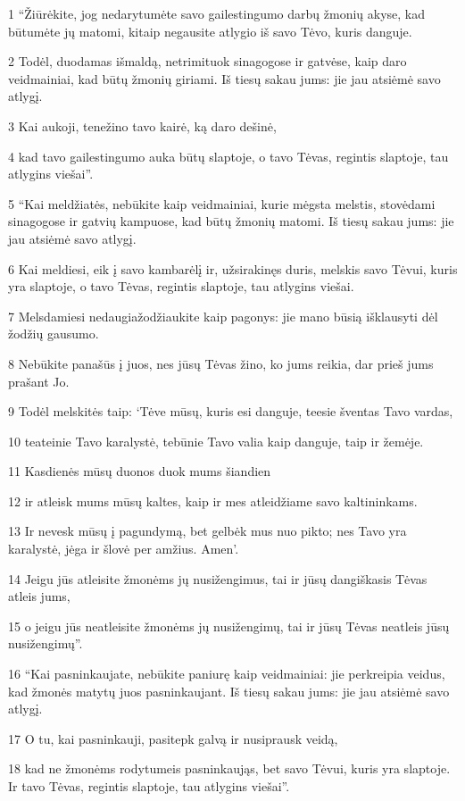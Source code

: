 \par 1 “Žiūrėkite, jog nedarytumėte savo gailestingumo darbų žmonių akyse, kad būtumėte jų matomi, kitaip negausite atlygio iš savo Tėvo, kuris danguje. 
\par 2 Todėl, duodamas išmaldą, netrimituok sinagogose ir gatvėse, kaip daro veidmainiai, kad būtų žmonių giriami. Iš tiesų sakau jums: jie jau atsiėmė savo atlygį. 
\par 3 Kai aukoji, tenežino tavo kairė, ką daro dešinė, 
\par 4 kad tavo gailestingumo auka būtų slaptoje, o tavo Tėvas, regintis slaptoje, tau atlygins viešai”. 
\par 5 “Kai meldžiatės, nebūkite kaip veidmainiai, kurie mėgsta melstis, stovėdami sinagogose ir gatvių kampuose, kad būtų žmonių matomi. Iš tiesų sakau jums: jie jau atsiėmė savo atlygį. 
\par 6 Kai meldiesi, eik į savo kambarėlį ir, užsirakinęs duris, melskis savo Tėvui, kuris yra slaptoje, o tavo Tėvas, regintis slaptoje, tau atlygins viešai. 
\par 7 Melsdamiesi nedaugiažodžiaukite kaip pagonys: jie mano būsią išklausyti dėl žodžių gausumo. 
\par 8 Nebūkite panašūs į juos, nes jūsų Tėvas žino, ko jums reikia, dar prieš jums prašant Jo. 
\par 9 Todėl melskitės taip: ‘Tėve mūsų, kuris esi danguje, teesie šventas Tavo vardas, 
\par 10 teateinie Tavo karalystė, tebūnie Tavo valia kaip danguje, taip ir žemėje. 
\par 11 Kasdienės mūsų duonos duok mums šiandien 
\par 12 ir atleisk mums mūsų kaltes, kaip ir mes atleidžiame savo kaltininkams. 
\par 13 Ir nevesk mūsų į pagundymą, bet gelbėk mus nuo pikto; nes Tavo yra karalystė, jėga ir šlovė per amžius. Amen’. 
\par 14 Jeigu jūs atleisite žmonėms jų nusižengimus, tai ir jūsų dangiškasis Tėvas atleis jums, 
\par 15 o jeigu jūs neatleisite žmonėms jų nusižengimų, tai ir jūsų Tėvas neatleis jūsų nusižengimų”. 
\par 16 “Kai pasninkaujate, nebūkite paniurę kaip veidmainiai: jie perkreipia veidus, kad žmonės matytų juos pasninkaujant. Iš tiesų sakau jums: jie jau atsiėmė savo atlygį. 
\par 17 O tu, kai pasninkauji, pasitepk galvą ir nusiprausk veidą, 
\par 18 kad ne žmonėms rodytumeis pasninkaująs, bet savo Tėvui, kuris yra slaptoje. Ir tavo Tėvas, regintis slaptoje, tau atlygins viešai”. 
